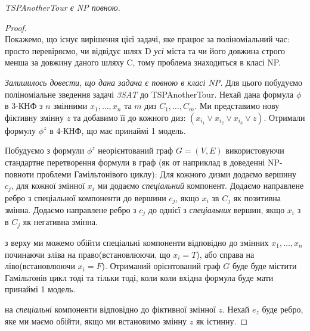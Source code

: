 \begin{theorem}
    \emph{TSPAnotherTour є NP повною.}
\end{theorem}
\begin{proof}
\\Покажемо, що існує вирішення цієї задачі, яке працює за поліноміальний час:
просто перевіряємо, чи відвідує шлях D \emph{усі} міста та чи його довжина
строго менша за довжину даного шляху C, тому проблема знаходиться в класі NP.

\emph{Залишилось довести, що дана задача є повною в класі NP.} Для цього
побудуємо поліноміальне зведення задачі \emph{3SAT} до TSPAnotherTour.
Нехай дана формула $\phi$ в 3-КНФ з $n$ змінними $x_{1},\ldots,x_{n}$ та $m$ диз
$C_{1},\ldots,C_{m}$. Ми представимо нову фіктивну змінну $z$ та добавимо її
до кожного диз: $(x_{i_{1}} \vee x_{i_{2}} \vee x_{i_{3}} \vee z)$.
Отримали формулу $\phi^{z}$ в 4-КНФ, що має принаймі 1 модель.

\par Побудуємо з формули $\phi^{z}$ неорієнтований граф $G=(V, E)$
використовуючи стандартне перетворення формули в граф (як от наприклад в доведенні
NP-повноти проблеми Гамільтонівого циклу): Для кожного диз ми додаємо вершину
$c_{j}$, для кожної змінної $x_{i}$ ми додаємо \emph{спеціальний} компонент.
Додаємо направлене ребро з спеціальної компоненти до вершини $c_{j}$, якщо 
$x_{i}$ з в $C_{j}$ як позитивна змінна. Додаємо направлене ребро
з $c_{j}$ до однієї з \emph{спеціальних} вершин, якщо $x_{i}$ з 
в $C_{j}$ як негативна змінна.

 з верху ми можемо обійти спеціальні компоненти відповідно до
змінних $x_{1},\ldots,x_{n}$ починаючи зліва на право(встановлюючи, що $x_{i} = T$), або
справа на ліво(встановлюючи $x_{i} = F$). Отриманий орієнтований граф $G$ буде
буде містити Гамільтонів цикл тоді та тільки тоді, коли коли вхідна формула
буде мати принаймі 1 модель. 

 на \emph{спеціальні} компоненти відповідно до фіктивної змінної
$z$. Нехай $e_{z}$ буде ребро, яке ми маємо обійти, якщо ми встановимо змінну
$z$ як істинну. 


\end{proof}
